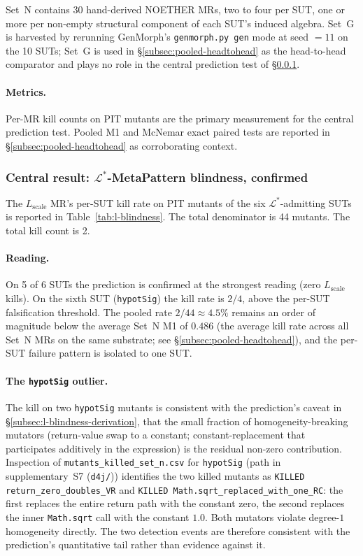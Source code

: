 \documentclass[acmsmall,screen,review]{acmart}
\begin{document}
Set~N contains 30 hand-derived NOETHER MRs, two to four per SUT, one
or more per non-empty structural component of each SUT's induced algebra. Set~G is
harvested by rerunning GenMorph's \texttt{genmorph.py gen} mode at
seed $=11$ on the 10 SUTs; Set~G is used in
\S\ref{subsec:pooled-headtohead} as the head-to-head comparator and
plays no role in the central prediction test of
\S\ref{subsec:l-blindness-confirmed}.

\paragraph{Metrics.}
Per-MR kill counts on PIT mutants are the primary measurement for the
central prediction test. Pooled M1 and McNemar exact paired tests are
reported in \S\ref{subsec:pooled-headtohead} as corroborating
context.

\subsubsection{Central result: \texorpdfstring{$\mathcal{L}^{*}$}{L*}-MetaPattern blindness, confirmed}
\label{subsec:l-blindness-confirmed}

The $L_{\mathrm{scale}}$ MR's per-SUT kill rate on PIT mutants of the
six $\mathcal{L}^{*}$-admitting SUTs is reported in
Table~\ref{tab:l-blindness}. The total denominator is 44 mutants. The
total kill count is 2.

\paragraph{Reading.}
On 5 of 6 SUTs the prediction is confirmed at the strongest reading
(zero $L_{\mathrm{scale}}$ kills). On the sixth SUT
(\texttt{hypotSig}) the kill rate is $2/4$, above the per-SUT
falsification threshold. The pooled rate $2/44 \approx 4.5\%$ remains
an order of magnitude below the average Set~N M1 of $0.486$ (the
average kill rate across all Set~N MRs on the same substrate; see
\S\ref{subsec:pooled-headtohead}), and the per-SUT failure pattern is
isolated to one SUT.

\paragraph{The \texttt{hypotSig} outlier.}
The kill on two \texttt{hypotSig} mutants is consistent with the
prediction's caveat in \S\ref{subsec:l-blindness-derivation}, that
the small fraction of homogeneity-breaking mutators (return-value
swap to a constant; constant-replacement that participates additively
in the expression) is the residual non-zero contribution. Inspection
of \texttt{mutants\_killed\_set\_n.csv} for \texttt{hypotSig} (path
in supplementary~S7 (\texttt{d4j/})) identifies the two killed mutants as
\texttt{KILLED\,return\_zero\_doubles\_VR} and
\texttt{KILLED\,Math.sqrt\_replaced\_with\_one\_RC}: the first
replaces the entire return path with the constant zero, the second
replaces the inner \texttt{Math.sqrt} call with the constant $1.0$.
Both mutators violate degree-$1$ homogeneity directly. The two
detection events are therefore consistent with the prediction's
quantitative tail rather than evidence against it.
\end{document}
